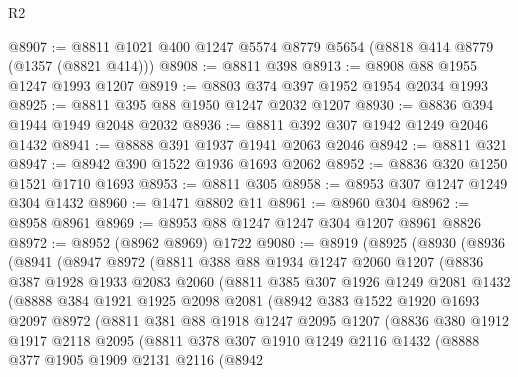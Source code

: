 \begin{lexlean}{R2}
\begin{coremodule}
@8907 := @8811 @1021 @400 @1247 @5574 @8779 @5654 (@8818 @414 @8779 (@1357 (@8821 @414)))
@8908 := @8811 @398
@8913 := @8908 @88 @1955 @1247 @1993 @1207
@8919 := @8803 @374 @397 @1952 @1954 @2034 @1993
@8925 := @8811 @395 @88 @1950 @1247 @2032 @1207
@8930 := @8836 @394 @1944 @1949 @2048 @2032
@8936 := @8811 @392 @307 @1942 @1249 @2046 @1432
@8941 := @8888 @391 @1937 @1941 @2063 @2046
@8942 := @8811 @321
@8947 := @8942 @390 @1522 @1936 @1693 @2062
@8952 := @8836 @320 @1250 @1521 @1710 @1693
@8953 := @8811 @305
@8958 := @8953 @307 @1247 @1249 @304 @1432
@8960 := @1471 @8802 @11
@8961 := @8960 @304
@8962 := @8958 @8961
@8969 := @8953 @88 @1247 @1247 @304 @1207 @8961 @8826
@8972 := @8952 (@8962 @8969) @1722
@9080 := @8919
    (@8925
      (@8930
        (@8936
          (@8941
            (@8947
              @8972
              (@8811
                @388
                @88
                @1934
                @1247
                @2060
                @1207
                (@8836
                  @387
                  @1928
                  @1933
                  @2083
                  @2060
                  (@8811
                    @385
                    @307
                    @1926
                    @1249
                    @2081
                    @1432
                    (@8888
                      @384
                      @1921
                      @1925
                      @2098
                      @2081
                      (@8942
                        @383
                        @1522
                        @1920
                        @1693
                        @2097
                        @8972
                        (@8811
                          @381
                          @88
                          @1918
                          @1247
                          @2095
                          @1207
                          (@8836
                            @380
                            @1912
                            @1917
                            @2118
                            @2095
                            (@8811
                              @378
                              @307
                              @1910
                              @1249
                              @2116
                              @1432
                              (@8888
                                @377
                                @1905
                                @1909
                                @2131
                                @2116
                                (@8942

\end{coremodule}
\end{lexlean}
